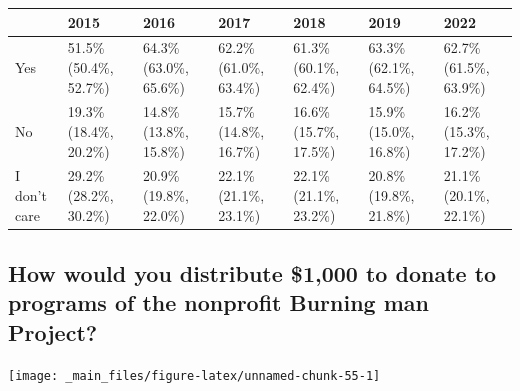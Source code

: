 \documentclass[
]{book}
\begin{document}
\begin{table}
\centering
\begin{tabular}[t]{>{}l|>{}l|>{}l|>{}l|>{}l|>{}l|>{}l}
\hline
  & 2015 & 2016 & 2017 & 2018 & 2019 & 2022\\
\hline
Yes & 51.5\% (50.4\%, 52.7\%) & 64.3\% (63.0\%, 65.6\%) & 62.2\% (61.0\%, 63.4\%) & 61.3\% (60.1\%, 62.4\%) & 63.3\% (62.1\%, 64.5\%) & 62.7\% (61.5\%, 63.9\%)\\
\hline
No & 19.3\% (18.4\%, 20.2\%) & 14.8\% (13.8\%, 15.8\%) & 15.7\% (14.8\%, 16.7\%) & 16.6\% (15.7\%, 17.5\%) & 15.9\% (15.0\%, 16.8\%) & 16.2\% (15.3\%, 17.2\%)\\
\hline
I don't care & 29.2\% (28.2\%, 30.2\%) & 20.9\% (19.8\%, 22.0\%) & 22.1\% (21.1\%, 23.1\%) & 22.1\% (21.1\%, 23.2\%) & 20.8\% (19.8\%, 21.8\%) & 21.1\% (20.1\%, 22.1\%)\\
\hline
\end{tabular}
\end{table}

\hypertarget{how-would-you-distribute-1000-to-donate-to-programs-of-the-nonprofit-burning-man-project}{%
\subsection{How would you distribute \$1,000 to donate to programs of the nonprofit Burning man Project?}\label{how-would-you-distribute-1000-to-donate-to-programs-of-the-nonprofit-burning-man-project}}

\texttt{[image: \_main\_files/figure-latex/unnamed-chunk-55-1]}
\end{document}
